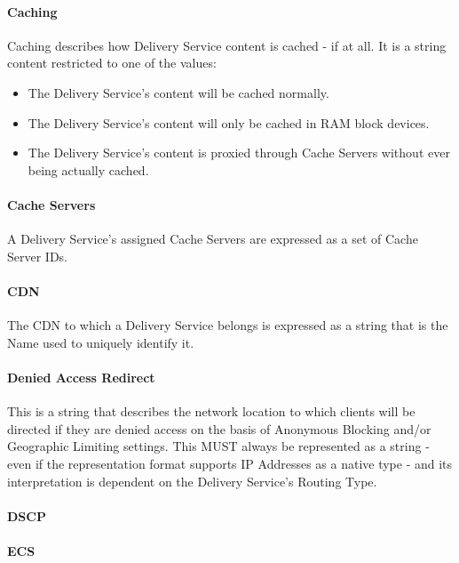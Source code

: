 \paragraph{Caching}
Caching describes how Delivery Service content is cached - if at all. It is a
string content restricted to one of the values:

\begin{itemize}
	\item {} The Delivery Service's content will be cached normally.
	\item {} The Delivery Service's content will only be cached
	in RAM block devices.
	\item {} The Delivery Service's content is proxied through
	Cache Servers without ever being actually cached.
\end{itemize}

\paragraph{Cache Servers}
A Delivery Service's assigned Cache Servers are expressed as a set of Cache
Server IDs.

\paragraph{CDN}
The CDN to which a Delivery Service belongs is expressed as a string that is the
Name used to uniquely identify it.


\paragraph{Denied Access Redirect}
This is a string that describes the network location to which clients will be
directed if they are denied access on the basis of Anonymous Blocking and/or
Geographic Limiting settings. This MUST always be represented as a string - even
if the representation format supports IP Addresses as a native type - and its
interpretation is dependent on the Delivery Service's Routing Type.

\paragraph{DSCP}

\paragraph{ECS}

